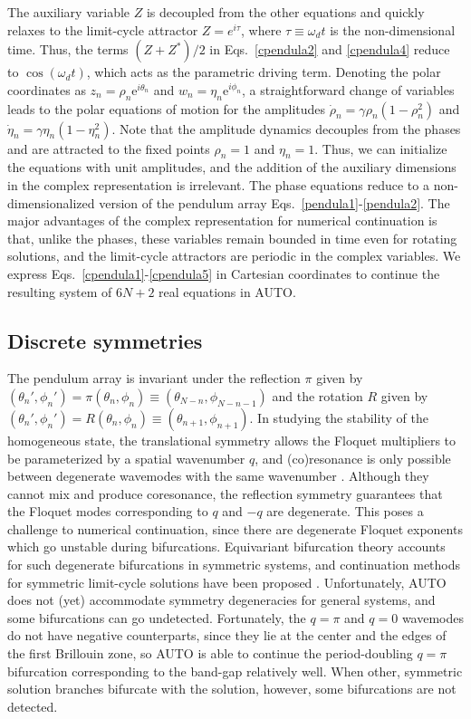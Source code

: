 \documentclass[aps,pre,amsmath,amssymb,floatfix,onecolumn,notitlepage,10pt]{revtex4-1}
\begin{document}
The auxiliary variable $Z$ is decoupled from the other equations and quickly relaxes to the limit-cycle attractor $Z=e^{i\tau}$, where $\tau\equiv \omega_d t$ is the non-dimensional time. Thus, the terms $(Z+Z^*)/2$ in Eqs.~\eqref{cpendula2} and \eqref{cpendula4} reduce to $\cos (\omega_d t)$, which acts as the parametric driving term. Denoting the polar coordinates as $z_n = \rho_n{\mathrm e}^{i\theta_n}$ and $w_n = \eta_n{\mathrm e}^{i\phi_n}$, a straightforward change of variables leads to the polar equations of motion for the amplitudes $\dot \rho_n = \gamma \rho_n \left(1-\rho_n^2\right)$ and$\dot \eta_n =  \gamma \eta_n \left(1-\eta_n^2\right)$. Note that the amplitude dynamics decouples from the phases and are attracted to the fixed points $\rho_n=1$ and $\eta_n=1$.  Thus, we can initialize the equations with unit amplitudes, and the addition of the auxiliary dimensions in the complex representation is irrelevant.  The phase equations reduce to a non-dimensionalized version of the pendulum array Eqs.~\eqref{pendula1}-\eqref{pendula2}. The major advantages of the complex representation for numerical continuation is that, unlike the phases, these variables remain bounded in time even for rotating solutions, and the limit-cycle attractors are periodic in the complex variables. We express Eqs.~\eqref{cpendula1}-\eqref{cpendula5} in Cartesian coordinates to continue the resulting system of $6N+2$ real equations in AUTO.

\subsection{Discrete symmetries}
The pendulum array is invariant under the reflection $\pi$ given by $(\theta_n',\phi_n') = \pi(\theta_n,\phi_n) \equiv (\theta_{N-n},\phi_{N-n-1})$ and the rotation $R$ given by $(\theta_n',\phi_n')=R(\theta_n,\phi_n)\equiv(\theta_{n+1},\phi_{n+1})$. In studying the stability of the homogeneous state, the translational symmetry allows the Floquet multipliers to be parameterized by a spatial wavenumber $q$, and (co)resonance is only possible between degenerate wavemodes with the same wavenumber \cite{2021_Nicolaou_2}. Although they cannot mix and produce coresonance, the reflection symmetry guarantees that the Floquet modes corresponding to $q$ and $-q$ are degenerate. This poses a challenge to numerical continuation, since there are degenerate Floquet exponents which go unstable during bifurcations. Equivariant bifurcation theory accounts for such degenerate bifurcations in symmetric systems, and continuation methods for symmetric limit-cycle solutions have been proposed \cite{2006_Wulff}. Unfortunately, AUTO does not (yet) accommodate symmetry degeneracies for general systems, and some bifurcations can go undetected.  Fortunately, the $q=\pi$ and $q=0$ wavemodes do not have negative counterparts, since they lie at the center and the edges of the first Brillouin zone, so AUTO is able to continue the period-doubling $q=\pi$ bifurcation corresponding to the band-gap relatively well. When other, symmetric solution branches bifurcate with the solution, however, some bifurcations are not detected.
\end{document}
